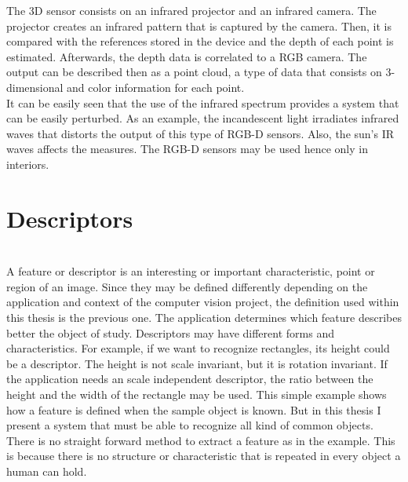 \label{rgb-d}

The 3D sensor consists on an infrared projector and an infrared camera. 
The projector creates an infrared pattern that is captured by the camera.
Then, it is compared with the references stored in the device and the depth of each point is estimated. 
Afterwards, the depth data is correlated to a RGB camera. 
The output can be described then as a point cloud, a type of data that consists on 3-dimensional and color information for each point.  
\\

It can be easily seen that the use of the infrared spectrum provides a system that can be easily perturbed. 
As an example, the incandescent light irradiates infrared waves that distorts the output of this type of RGB-D sensors. 
Also, the sun's IR waves affects the measures. 
The RGB-D sensors may be used hence only in interiors. 



\section{Descriptors}
\label{descriptors}

\\
A feature or descriptor is an interesting or important characteristic, point or region of an image. 
Since they may be defined differently depending on the application and context of the computer vision project, the definition used within this thesis is the previous one. 
The application determines which feature describes better the object of study. 
Descriptors may have different forms and characteristics. 
For example, if we want to recognize rectangles, its height could be a descriptor.
The height is not scale invariant, but it is rotation invariant. 
If the application needs an scale independent descriptor, the ratio between the height and the width of the rectangle may be used. 
This simple example shows how a feature is defined when the sample object is known. 
But in this thesis I present a system that must be able to recognize all kind of common objects. 
There is no straight forward method to extract a feature as in the example. 
This is because there is no structure or characteristic that is repeated in every object a human can hold. 
 
\\

